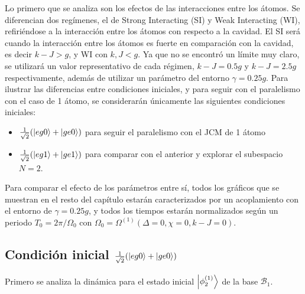 Lo primero que se analiza son los efectos de las interacciones entre los átomos. Se diferencian dos regímenes, el de Strong Interacting (SI) y Weak Interacting (WI), refiriéndose a la interacción entre los átomos con respecto a la cavidad. El SI será cuando la interacción entre los átomos es fuerte en comparación con la cavidad, es decir $k-J>g$, y WI con $k,J<g$. Ya que no se encontró un límite muy claro, se utilizará un valor representativo de cada régimen, $k-J=0.5g$ y $k-J=2.5g$ respectivamente, además de utilizar un parámetro del entorno $\gamma=0.25g$. Para ilustrar las diferencias entre condiciones iniciales, y para seguir con el paralelismo con el caso de 1 átomo, se considerarán únicamente las siguientes condiciones iniciales:
\begin{itemize}
    \item $\frac{1}{\sqrt{2}}(\ket{eg0}+\ket{ge0})$ para seguir el paralelismo con el JCM de 1 átomo 
    \item $\frac{1}{\sqrt{2}}(\ket{eg1}+\ket{ge1})$ para comparar con el anterior y explorar el subespacio $N=2$.
\end{itemize}

Para comparar el efecto de los parámetros entre sí, todos los gráficos que se muestran en el resto del capítulo estarán caracterizados por un acoplamiento con el entorno de $\gamma=0.25g$, y todos los tiempos estarán normalizados según un periodo $T_0=2\pi/\Omega_0$ con $\Omega_0=\Omega^{(1)}(\Delta=0,\chi=0,k-J=0)$.
\subsection{Condición inicial $\frac{1}{\sqrt{2}}(\ket{eg0}+\ket{ge0})$}
Primero se analiza la dinámica para el estado inicial $\ket{\phi_2^{(1)}}$ de la base $\mathcal{B}_1$.
